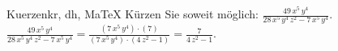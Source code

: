 \begin{MAufgabe}{Kuerzen}{kr, dh, MaTeX}
K\"urzen Sie soweit m\"oglich: $\frac{49\, x^5\, y^4}{28\, x^5\, y^4\, z^2 - 7\, x^5\, y^4}$.\\ 
\ifLsg\MLoesung
\quad $\frac{49\, x^5\, y^4}{28\, x^5\, y^4\, z^2 - 7\, x^5\, y^4}=\frac{(7\, x^5\, y^4)\cdot(7)}{(7\, x^5\, y^4)\cdot(4\, z^2 - 1)}=\frac{7}{4\, z^2 - 1}$.\else\relax\fi
 \end{MAufgabe}